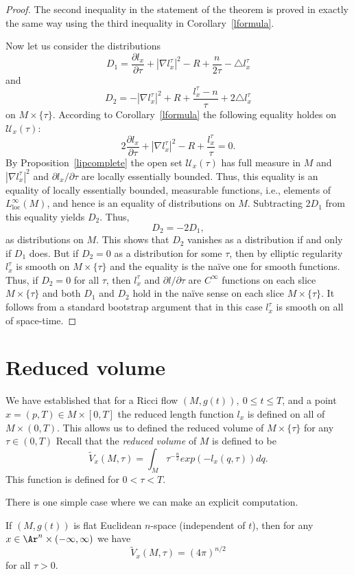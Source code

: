\begin{proof}
The second inequality in the statement of the theorem is proved in
exactly the same way using the third inequality in
Corollary~\ref{lformula}.

Now let us consider the distributions
$$D_1=\frac{\partial l_x}{\partial \tau}+|\nabla l_x^\tau|^2-R+\frac{n}{2\tau}- \triangle
l_x^\tau $$ and
$$D_2=-|\nabla
l_x^\tau|^2+R+\frac{l_x^\tau-n}{\tau}+2\triangle l_x^\tau
$$ on $M\times\{\tau\}$. According to Corollary~\ref{lformula} the following equality
holdes on ${\mathcal U}_x(\tau)$:
$$2\frac{\partial l_x}{\partial \tau}+|\nabla l_x^\tau|^2-R+\frac{l_x^\tau}{\tau}=0.$$
By Proposition~\ref{lipcomplete} the open set ${\mathcal U}_x(\tau)$
has full measure in $M$ and $|\nabla l_x^\tau|^2$ and $\partial
l_x/\partial\tau$ are locally essentially bounded. Thus, this
equality is an equality of locally essentially bounded, measurable
functions, i.e., elements of $L_\mathrm{loc}^\infty(M)$, and hence is
an equality of distributions on $M$. Subtracting $2D_1$ from this
equality yields $D_2$. Thus,
$$D_2=-2D_1,$$
as distributions on $M$. This shows that $D_2$ vanishes as a
distribution if and only if $D_1$ does. But if $D_2=0$ as a
distribution for some $\tau$, then by elliptic regularity $l_x^\tau$
is smooth on $M\times\{\tau\}$ and the equality is the na\"ive one
for smooth functions. Thus, if $D_2=0$ for all $\tau$, then
$l_x^\tau$ and $\partial l/\partial \tau$ are $C^\infty$ functions
on each slice $M\times\{\tau\}$ and both $D_1$ and $D_2$ hold in the
na\"ive sense on each slice $M\times \{\tau\}$. It follows from a
standard bootstrap argument that in this case $l_x^\tau$ is smooth
on all of space-time.%
\end{proof}


\section{Reduced volume}



We have established that for a Ricci flow $(M,g(t)),\ 0\le t\le T$,
and a point  $x=(p,T)\in M\times [0,T]$ the reduced length function
$l_x$ is defined on all of $M\times (0,T)$. This allows us to
defined the reduced volume of $M\times \{\tau\}$ for any $\tau\in
(0,T)$ Recall that the {\sl reduced volume} of
$M$ is defined to be
$$\widetilde V_x(M,\tau) = \int_{M} \tau^{-\frac{n}{2}}exp(-l_x(q,\tau))dq.$$
This function is defined for $0<\tau<T$.

There is one simple case where we can make an explicit computation.
\begin{lemma}
\label{lem:reduced-volume-flat-space}
\label{flat}
If $(M,g(t))$ is flat Euclidean $n$-space (independent of $t$), then
for any $x\in \Ar^n\times (-\infty,\infty)$ we have
$$\widetilde V_x(M,\tau)=(4\pi)^{n/2}$$ for all $\tau>0$.
\end{lemma}


